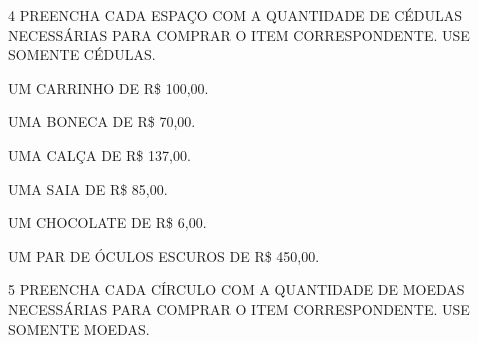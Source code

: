 
\num{4} PREENCHA CADA ESPAÇO COM A QUANTIDADE DE CÉDULAS NECESSÁRIAS PARA COMPRAR O ITEM CORRESPONDENTE. USE SOMENTE CÉDULAS.


\begin{escolha}
\item UM CARRINHO DE R\$ 100,00.


\item UMA BONECA DE R\$ 70,00.


\item UMA CALÇA DE R\$ 137,00.


\item UMA SAIA DE R\$ 85,00.


\item UM CHOCOLATE DE R\$ 6,00.


\item UM PAR DE ÓCULOS ESCUROS DE R\$ 450,00.

\end{escolha}


\num{5} PREENCHA CADA CÍRCULO COM A QUANTIDADE DE MOEDAS NECESSÁRIAS PARA COMPRAR O ITEM CORRESPONDENTE. USE SOMENTE MOEDAS.


